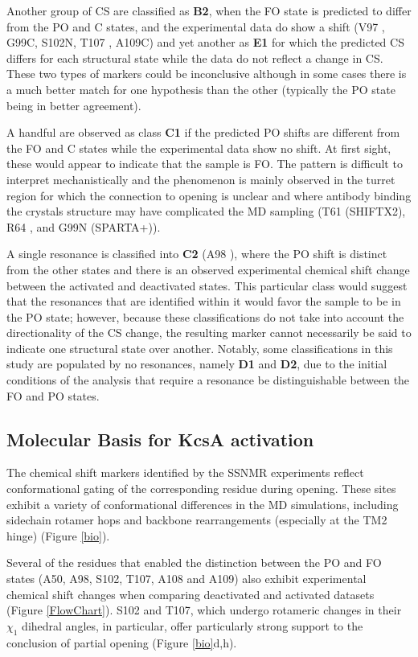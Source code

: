 \documentclass[%
 aip,
 amsmath,amssymb,
 preprint,%
]{revtex4-1}
\newcommand{\ca}{\ce{C_\alpha} }
\newcommand{\cb}{\ce{C_\beta} }
\begin{document}
Another group of CS are classified as \textbf{B2}, when the FO state is predicted to differ from the PO and C states, and the experimental data do show a shift (V97\cb, G99C, S102N, T107\cb, A109C) and yet another as \textbf{E1} for which the predicted CS differs for each structural state while the data do not reflect a change in CS. These two types of markers could be inconclusive although in some cases there is a much better match for one hypothesis than the other (typically the PO state being in better agreement). 
 
A handful are observed as class \textbf{C1} if the predicted PO shifts are different from the FO and C states while the experimental data show no shift. At first sight, these would appear to indicate that the sample is FO. The pattern is difficult to interpret mechanistically and the phenomenon is mainly observed in the turret region for which the connection to opening is unclear and where antibody binding the crystals structure may have complicated the MD sampling (T61\cb (SHIFTX2), R64\cb, and G99N (SPARTA+)).

A single resonance is classified into \textbf{C2} (A98\ca), where the PO shift is distinct from the other states and there is an observed experimental chemical shift change between the activated and deactivated states. This particular class would suggest that the resonances that are identified within it would favor the sample to be in the PO state; however, because these classifications do not take into account the directionality of the CS change, the resulting marker cannot necessarily be said to indicate one structural state over another. Notably, some classifications in this study are populated by no resonances, namely \textbf{D1} and \textbf{D2}, due to the initial conditions of the analysis that require a resonance be distinguishable between the FO and PO states.


\subsection{Molecular Basis for KcsA activation}

The chemical shift markers identified by the SSNMR experiments reflect conformational gating of the corresponding residue during opening. These sites exhibit a variety of conformational differences in the MD simulations, including sidechain rotamer hops and backbone rearrangements (especially at the TM2 hinge) (Figure \ref{bio}).

Several of the residues that enabled the distinction between the PO and FO states (A50, A98, S102, T107, A108 and A109) also exhibit experimental chemical shift changes when comparing deactivated and activated datasets (Figure \ref{FlowChart}). S102 and T107, which undergo rotameric changes in their $\chi_1$ dihedral angles, in particular, offer particularly strong support to the conclusion of partial opening (Figure \ref{bio}d,h). 
\end{document}
